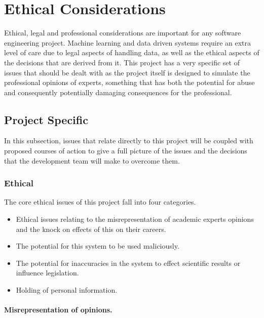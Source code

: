 \documentclass{ecmm427_assignment}
\begin{document}
\section{Ethical Considerations}

Ethical, legal and professional considerations are important for any
software engineering project. Machine learning and data driven systems
require an extra level of care due to legal aspects of handling data,
as well as the ethical aspects of the decisions that are derived from
it. This project has a very specific set of issues that should be
dealt with as the project itself is designed to simulate the professional
opinions of experts, something that has both the potential for abuse
and consequently potentially damaging consequences for the professional. 

\subsection{Project Specific}

In this subsection, issues that relate directly to this project will
be coupled with proposed courses of action to give a full picture
of the issues and the decisions that the development team will make
to overcome them. 

\subsubsection{Ethical}

The core ethical issues of this project fall into four categories. 
\begin{itemize}
\item Ethical issues relating to the misrepresentation of academic experts
opinions and the knock on effects of this on their careers.
\item The potential for this system to be used maliciously.
\item The potential for inaccuracies in the system to effect scientific
results or influence legislation. 
\item Holding of personal information.
\end{itemize}

\paragraph{Misrepresentation of opinions.}
\end{document}

